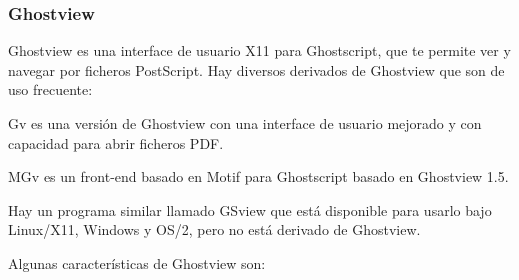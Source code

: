

\subsubsection*{Ghostview}

{\sf  Ghostview}   es  una   interface  de   usuario  X11   para  {\sf
Ghostscript}, que  te permite ver  y navegar por  ficheros PostScript.
Hay diversos derivados de {\sf Ghostview} que son de uso frecuente:

{\sf  Gv} es  una  versión de  {\sf Ghostview}  con  una interface  de
usuario mejorado y con capacidad para abrir ficheros PDF.

{\sf MGv}  es un  front-end  basado en  Motif  para {\sf  Ghostscript}
{\sf basado en Ghostview 1.5}.

Hay un programa similar llamado  {\sf GSview} que está disponible para
usarlo bajo Linux/X11,  Windows y OS/2, pero no está  derivado de {\sf
Ghostview}.

Algunas características de {\sf Ghostview} son:

